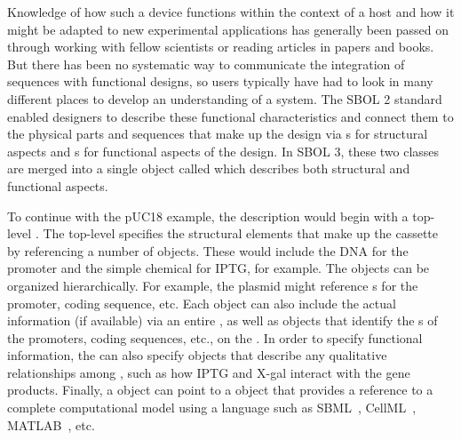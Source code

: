 Knowledge of how such a device functions within the context of a host and how it might be adapted to new experimental applications has generally been passed on through working with fellow scientists or reading articles in papers and books. 
But there has been no systematic way to communicate the integration of sequences with functional designs, so users typically have had to look in many different places to develop an understanding of a system.  The SBOL 2 standard enabled designers to describe these functional characteristics and connect them to the physical parts and sequences that make up the design via s for structural aspects and s for functional aspects of the design.
In SBOL 3, these two classes are merged into a single object called  which describes both structural and functional aspects.

To continue with the pUC18 example, the description would begin with a top-level .  The top-level  specifies the structural elements that make up the cassette by referencing a number of  objects. These would include the DNA  for the promoter and the simple chemical
 for IPTG, for example.  
The  objects can be organized hierarchically.  For example, the plasmid  might reference s for the promoter, coding sequence, etc.  Each  object can also include the actual  information (if available) via an entire  , as well as  objects that identify the s of the promoters, coding sequences, etc., on the .  In order to specify functional information, the  can also specify  objects that describe any qualitative relationships among  , such as how IPTG and X-gal interact with the gene products.  Finally, a  object can point to a  object that provides a reference to a complete computational model using a language such as SBML~\cite{SBML}, CellML~\cite{CellML}, MATLAB~\cite{matlab}, etc.


